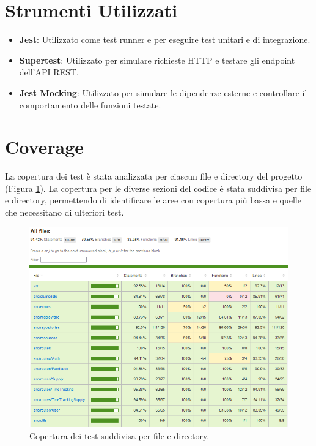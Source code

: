 \documentclass[twoside]{supsistudent}
\begin{document}
\section{Strumenti Utilizzati}

\begin{itemize}
  \item \textbf{Jest}: Utilizzato come test runner e per eseguire test unitari e di integrazione.
  \item \textbf{Supertest}: Utilizzato per simulare richieste HTTP e testare gli endpoint dell'API REST.
  \item \textbf{Jest Mocking}: Utilizzato per simulare le dipendenze esterne e controllare il comportamento delle funzioni testate.
\end{itemize}

\section{Coverage}
La copertura dei test è stata analizzata per ciascun file e directory del progetto (Figura \ref{fig:coverage}). La copertura per le diverse sezioni del codice è stata suddivisa per file e directory, permettendo di identificare le aree con copertura più bassa e quelle che necessitano di ulteriori test.

\begin{figure}[ht]
  \centering
  \includegraphics[scale=0.8]{./images/test-coverage.png}
  \caption{Copertura dei test suddivisa per file e directory.}
  \label{fig:coverage}
\end{figure}
\end{document}
